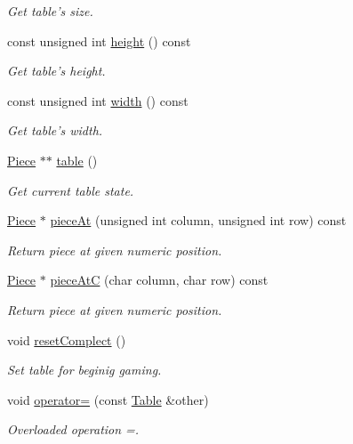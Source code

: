 \begin{DoxyCompactItemize}
\begin{DoxyCompactList}\small\item\em Get table's size. \item\end{DoxyCompactList}\item 
const unsigned int \hyperlink{classChEngn_1_1Table_a9502a1090bcb852c162934a792c2360a}{height} () const 
\begin{DoxyCompactList}\small\item\em Get table's height. \item\end{DoxyCompactList}\item 
const unsigned int \hyperlink{classChEngn_1_1Table_a6aaaaae9343e67a947b0cdeb6104361b}{width} () const 
\begin{DoxyCompactList}\small\item\em Get table's width. \item\end{DoxyCompactList}\item 
\hyperlink{classChEngn_1_1Piece}{Piece} $\ast$$\ast$ \hyperlink{classChEngn_1_1Table_a7e403087a7979907ca171e20462f8346}{table} ()
\begin{DoxyCompactList}\small\item\em Get current table state. \item\end{DoxyCompactList}\item 
\hyperlink{classChEngn_1_1Piece}{Piece} $\ast$ \hyperlink{classChEngn_1_1Table_a5f797f91cf61269b04d19ede97875ba4}{pieceAt} (unsigned int column, unsigned int row) const 
\begin{DoxyCompactList}\small\item\em Return piece at given numeric position. \item\end{DoxyCompactList}\item 
\hyperlink{classChEngn_1_1Piece}{Piece} $\ast$ \hyperlink{classChEngn_1_1Table_a715d819b37f5cb853209ac36d06c8a89}{pieceAtC} (char column, char row) const 
\begin{DoxyCompactList}\small\item\em Return piece at given numeric position. \item\end{DoxyCompactList}\item 
void \hyperlink{classChEngn_1_1Table_a8ece9e9f9f28f209d72f16db0fb2aeed}{resetComplect} ()
\begin{DoxyCompactList}\small\item\em Set table for beginig gaming. \item\end{DoxyCompactList}\item 
void \hyperlink{classChEngn_1_1Table_a5b45cb67e40f75358145826e72b319b4}{operator=} (const \hyperlink{classChEngn_1_1Table}{Table} \&other)
\begin{DoxyCompactList}\small\item\em Overloaded operation =. \item\end{DoxyCompactList}\end{DoxyCompactItemize}
